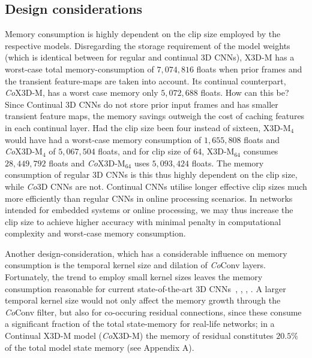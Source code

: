 \subsection{Design considerations} \label{sec:design-considerations}
\vspace{-1mm}
Memory consumption is highly dependent on the clip size employed by the respective models. 
Disregarding the storage requirement of the model weights (which is identical between for regular and continual 3D CNNs), X3D-M has a worst-case total memory-consumption of $7{,}074{,}816$ floats when prior frames and the transient feature-maps are taken into account.
Its continual counterpart, \textit{Co}X3D-M, has a worst case memory only $5{,}072{,}688$ floats. 
How can this be? 
Since Continual 3D CNNs do not store prior input frames and has smaller transient feature maps, the memory savings outweigh the cost of caching features in each continual layer.
Had the clip size been four instead of sixteen, X3D-M$_4$ would have had a worst-case memory consumption of $1{,}655{,}808$ floats and \textit{Co}X3D-M$_4$ of $5{,}067{,}504$ floats, and for clip size of 64, X3D-M$_{64}$ consumes $28{,}449{,}792$ floats and \textit{Co}X3D-M$_{64}$ uses $5{,}093{,}424$ floats.
The memory consumption of regular 3D CNNs is this thus highly dependent on the clip size, while \textit{Co}3D CNNs are not.
%
Continual CNNs utilise longer effective clip sizes much more efficiently than regular CNNs in online processing scenarios. 
In networks intended for embedded systems or online processing, we may thus increase the clip size to achieve higher accuracy with minimal penalty in computational complexity and worst-case memory consumption.

Another design-consideration, which has a considerable influence on memory consumption is the temporal kernel size and dilation of \textit{Co}Conv layers.
Fortunately, the trend to employ small kernel sizes leaves the memory consumption reasonable for current state-of-the-art 3D CNNs~\cite{carreira2017quo}, \cite{tran2018closer}, \cite{feichtenhofer2019slowfast}, \cite{feichtenhofer2020x3d}. A larger temporal kernel size would not only affect the memory growth through the \textit{Co}Conv filter, but also for co-occuring residual connections, since these  consume a significant fraction of the total state-memory for real-life networks; in a Continual X3D-M model (\textit{Co}X3D-M) the memory of residual constitutes $20.5 \%$ of the total model state memory (see Appendix A).

